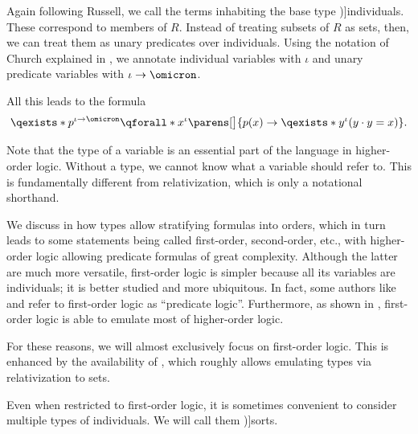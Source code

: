 \begin{concept}
\begin{thmenum}
    Again following Russell, we call the terms inhabiting the base type \term[en=individuals (\cite[237]{Russell1908TypeTheory})]{individuals}. These correspond to members of \( R \). Instead of treating subsets of \( R \) as sets, then, we can treat them as unary predicates over individuals. Using the notation of Church explained in , we annotate individual variables with \( \iota \) and unary predicate variables with \( \iota \rightarrow \omicron \).

    All this leads to the formula
    \begin{equation*}
      \qexists* {p^{\iota \rightarrow \omicron}} \qforall* {x^{\iota}} \parens[\big]{ p(x) \rightarrow \qexists* {y^{\iota}} (y \cdot y = x) }.
    \end{equation*}

    Note that the type of a variable is an essential part of the language in higher-order logic. Without a type, we cannot know what a variable should refer to. This is fundamentally different from relativization, which is only a notational shorthand.

    We discuss in  how types allow stratifying formulas into orders, which in turn leads to some statements being called first-order, second-order, etc., with higher-order logic allowing predicate formulas of great complexity. Although the latter are much more versatile, first-order logic is simpler because all its variables are individuals; it is better studied and more ubiquitous. In fact, some authors like \textcite[ch. 2]{VanDalen2004LogicAndStructure} and \textcite[\S I.9]{КолмогоровДрагалин2006ЛогикаВведение} refer to first-order logic as \enquote{predicate logic}. Furthermore, as shown in , first-order logic is able to emulate most of higher-order logic.

    For these reasons, we will almost exclusively focus on first-order logic. This is enhanced by the availability of , which roughly allows emulating types via relativization to sets.

     Even when restricted to first-order logic, it is sometimes convenient to consider multiple types of individuals. We will call them \term[en=sorts (\cite[35]{BaaderNipkow2012TermRewriting})]{sorts}.


\end{thmenum}
\end{concept}
